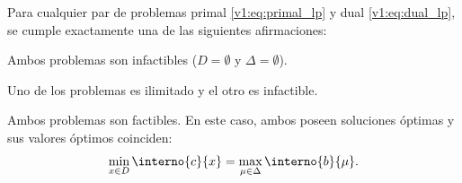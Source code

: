 \begin{theorem}\label{v1:thm:dualidad_fuerte_lp}
 Para cualquier par de problemas primal \eqref{v1:eq:primal_lp} y dual \eqref{v1:eq:dual_lp}, se cumple exactamente una de las siguientes afirmaciones:
 \begin{enuthm}
 \item Ambos problemas son infactibles ($D = \emptyset$ y $\Delta = \emptyset$).
 \item Uno de los problemas es ilimitado y el otro es infactible.
 \item Ambos problemas son factibles. En este caso, ambos poseen soluciones óptimas y sus valores óptimos coinciden:
 \begin{equation}
 \min_{x \in D} \interno{c}{x} = \max_{\mu \in \Delta} \interno{b}{\mu}.
 \label{v1:eq:dual_fuerte_lp_eq}
 \end{equation}
 \end{enuthm}
\end{theorem}

